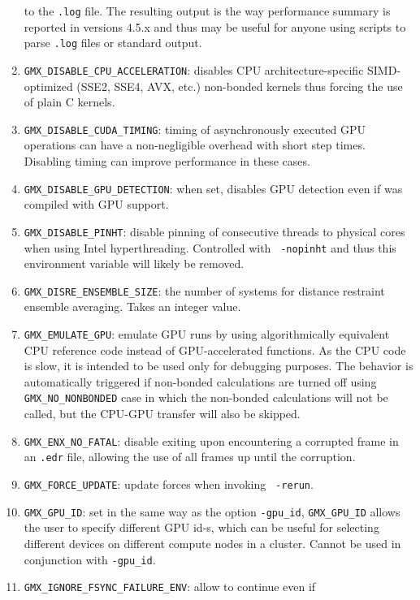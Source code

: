 \begin{enumerate}
        to the {\tt .log} file. The resulting output is the way performance summary is reported in versions
        4.5.x and thus may be useful for anyone using scripts to parse {\tt .log} files or standard output.
\item   {\tt GMX_DISABLE_CPU_ACCELERATION}: disables CPU architecture-specific SIMD-optimized (SSE2, SSE4, AVX, etc.)
        non-bonded kernels thus forcing the use of plain C kernels.
\item   {\tt GMX_DISABLE_CUDA_TIMING}: timing of asynchronously executed GPU operations can have a
        non-negligible overhead with short step times. Disabling timing can improve performance in these cases.
\item   {\tt GMX_DISABLE_GPU_DETECTION}: when set, disables GPU detection even if {\tt {}} was compiled
        with GPU support.
\item   {\tt GMX_DISABLE_PINHT}: disable pinning of consecutive threads to physical cores when using
        Intel hyperthreading. Controlled with {\tt {} -nopinht} and thus this environment
        variable will likely be removed.
\item   {\tt GMX_DISRE_ENSEMBLE_SIZE}: the number of systems for distance restraint ensemble
        averaging. Takes an integer value.
\item   {\tt GMX_EMULATE_GPU}: emulate GPU runs by using algorithmically equivalent CPU reference code instead of
        GPU-accelerated functions. As the CPU code is slow, it is intended to be used only for debugging purposes.
        The behavior is automatically triggered if non-bonded calculations are turned off using {\tt GMX_NO_NONBONDED}
        case in which the non-bonded calculations will not be called, but the CPU-GPU transfer will also be skipped.
\item   {\tt GMX_ENX_NO_FATAL}: disable exiting upon encountering a corrupted frame in an {\tt .edr}
        file, allowing the use of all frames up until the corruption.
\item   {\tt GMX_FORCE_UPDATE}: update forces when invoking {\tt {} -rerun}.
\item   {\tt GMX_GPU_ID}: set in the same way as the {\tt {}} option {\tt -gpu_id}, {\tt GMX_GPU_ID}
        allows the user to specify different GPU id-s, which can be useful for selecting different
        devices on different compute nodes in a cluster.  Cannot be used in conjunction with {\tt -gpu_id}.
\item   {\tt GMX_IGNORE_FSYNC_FAILURE_ENV}: allow {\tt {}} to continue even if

\end{enumerate}

